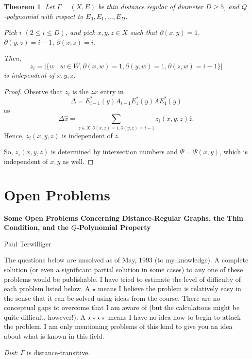 \documentclass[
]{book}
\newtheorem{theorem}{Theorem}[chapter]
\theoremstyle{definition}
\theoremstyle{definition}
\theoremstyle{definition}
\theoremstyle{definition}
\theoremstyle{remark}
\begin{document}
\begin{theorem}
\protect\hypertarget{thm:zi}{}\label{thm:zi}Let \(\Gamma = (X, E)\) be thin distance regular of diameter \(D\geq 5\), and \(Q\)-polynomial with respect to \(E_0, E_1, \ldots, E_D\).

Pick \(i\) \((2\leq i\leq D)\), and pick \(x, y, z\in X\) such that \(\partial(x,y) =1\), \(\partial(y,z) = i-1\), \(\partial(x,z) = i\).

Then,
\[z_i = |\{w\mid w\in W, \partial(x,w) =1, \partial(y,w)=1, \partial(z,w)=i-1\}|\]
is independent of \(x, y, z\).
\end{theorem}

\begin{proof}
Observe that \(z_i\) is the \(zx\) entry in
\[\Delta = E^*_{i-1}(y)A_{i-1}E^*_1(y)AE^*_1(y)\]
as
\[\Delta \hat{x} = \sum_{z\in X, \partial(x,z)=i, \partial(y,z)=i-1}z_i(x,y,z)\hat{z}.\]
Hence, \(z_i(x,y,z)\) is independent of \(z\).

So, \(z_i(x,y,z)\) is determined by intersection numbers and \(\Psi = \Psi(x,y)\), which is independent of \(x, y\) as well.
\end{proof}

\hypertarget{appendix-appendix}{%
\appendix}


\hypertarget{prob}{%
\chapter{Open Problems}\label{prob}}

\textbf{Some Open Problems Concerning Distance-Regular Graphs, the Thin Condition, and the \(Q\)-Polynomial Property}

Paul Terwilliger

\hfill\break

The questions below are unsolved as of May, 1993 (to my knowledge). A complete solution (or even a significant partial solution in some cases) to any one of these problems would be publishable. I have tried to estimate the level of difficulty of each problem listed below. A \(\star\) means I believe the problem is relatively easy in the sense that it can be solved using ideas from the course. There are no conceptual gaps to overcome that I am aware of (but the calculations might be quite difficult, however!). A \(\star\star\)\(\star\star\) means I have no idea how to begin to attack the problem. I am only mentioning problems of this kind to give you an idea about what is known in this field.

\hfill\break
\emph{Dist}: \(\Gamma\) is distance-transitive.
\end{document}
